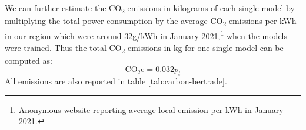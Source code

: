 We can further estimate the CO\textsubscript{2} emissions in kilograms of each single model by multiplying the total power consumption by the average CO\textsubscript{2} emissions per kWh in our region which were around 32g/kWh in January 2021,\footnote{Anonymous website reporting average local emission per kWh in January 2021.} when the models were trained. Thus the total CO\textsubscript{2} emissions in kg for one single model can be computed as:
\[
    \text{CO}_{2}\text{e} = 0.032 p_t
\]
All emissions are also reported in table \ref{tab:carbon-bertrade}.
